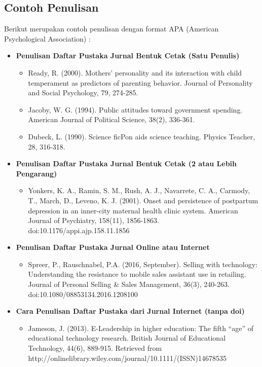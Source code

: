 \documentclass{article}
\begin{document}
\subsection{Contoh Penulisan}
Berikut merupakan contoh penulisan dengan format APA (American Psychological Association)\cite{salamadian} : 
\begin{itemize}
    \item \textbf{Penulisan Daftar Pustaka Jurnal Bentuk Cetak (Satu Penulis)}
    \begin{itemize}
        \item Ready, R. (2000). Mothers’ personality and its interaction with child temperament as predictors of parenting behavior. Journal of Personality and Social Psychology, 79, 274-285.
        \item Jacoby, W. G. (1994). Public attitudes toward government spending. American Journal of Political Science, 38(2), 336-361.
        \item  Dubeck, L. (1990). Science ﬁcPon aids science teaching. Physics Teacher, 28, 316-318.
    \end{itemize}
    \item \textbf{Penulisan Daftar Pustaka Jurnal Bentuk Cetak (2 atau Lebih Pengarang)}
    \begin{itemize}
        \item Yonkers, K. A., Ramin, S. M., Rush, A. J., Navarrete, C. A., Carmody, T., March, D., Leveno, K. J. (2001). Onset and persistence of postpartum depression in an inner-city maternal health clinic system. American Journal of Psychiatry, 158(11), 1856-1863. doi:10.1176/appi.ajp.158.11.1856        
    \end{itemize}
    \item \textbf{Penulisan Daftar Pustaka Jurnal Online atau Internet}
    \begin{itemize}
        \item Spreer, P., Rauschnabel, P.A. (2016, September). Selling with technology: Understanding the resistance to mobile sales assistant use in retailing. Journal of Personal Selling \& Sales Management, 36(3), 240-263. doi:10.1080/08853134.2016.1208100        
    \end{itemize}
    \item \textbf{Cara Penulisan Daftar Pustaka dari Jurnal Internet (tanpa doi)}
    \begin{itemize}
        \item Jameson, J. (2013). E-Leadership in higher education: The ﬁfth “age” of educational technology research. British Journal of Educational Technology, 44(6), 889-915. Retrieved from http://onlinelibrary.wiley.com/journal/10.1111/(ISSN)14678535       
    \end{itemize}
\end{itemize}
\end{document}
